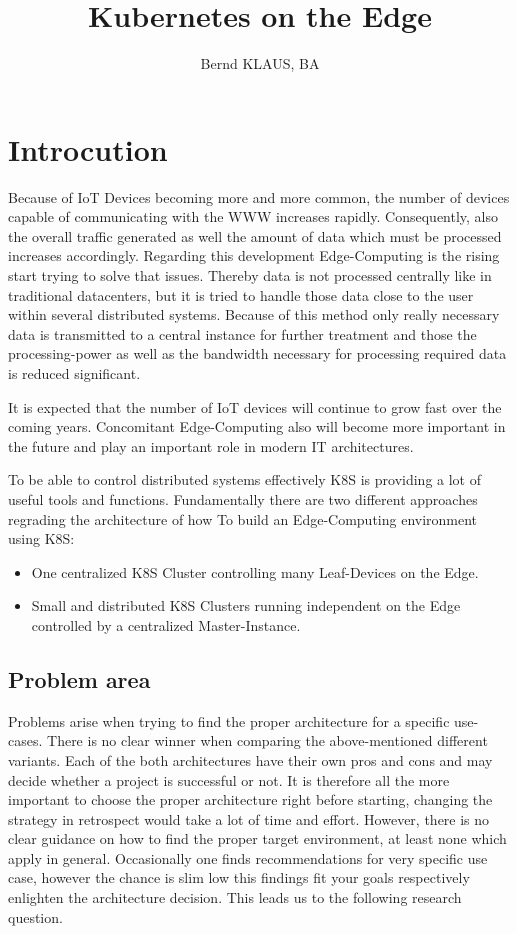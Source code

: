 \documentclass[MSC,Master,english]{twbook}%
\title{Kubernetes on the Edge}
\author{Bernd KLAUS, BA}
\begin{document}
\maketitle

\chapter{Introcution}
Because of IoT Devices becoming more and more common, the number of devices capable of communicating
with the \ac{WWW} increases rapidly. Consequently, also the overall traffic generated as well the
amount of data which must be processed increases accordingly. Regarding this development
Edge-Computing is the rising start trying to solve that issues. Thereby data is not processed
centrally like in traditional datacenters, but it is tried to handle those data close to the user 
within several distributed systems. Because of this method only really necessary data is transmitted
to a central instance for further treatment and those the processing-power as well as the bandwidth
necessary for processing required data is reduced significant. \par
It is expected that the number of IoT devices will continue to grow fast\cite{SotE21} over the
coming years. Concomitant Edge-Computing also will become more important in the future and play
an important role in modern \ac{IT} architectures. \par
To be able to control distributed systems effectively \ac{K8S} is providing a lot of useful tools
and functions. Fundamentally there are two different approaches regrading the architecture of how To
build an Edge-Computing environment using \ac{K8S}:

\begin{itemize}
    \item One centralized \ac{K8S} Cluster controlling many Leaf-Devices on the Edge.
    \item Small and distributed \ac{K8S} Clusters running independent on the Edge controlled by a
    centralized Master-Instance.
\end{itemize}

\section{Problem area}
Problems arise when trying to find the proper architecture for a specific use-cases. There is no
clear winner when comparing the above-mentioned different variants. Each of the both architectures
have their own pros and cons and may decide whether a project is successful or not. It is therefore
all the more important to choose the proper architecture right before starting, changing the
strategy in retrospect would take a lot of time and effort. However, there is no clear guidance on
how to find the proper target environment, at least none which apply in general. Occasionally one
finds recommendations for very specific use case, however the chance is slim low this findings fit
your goals respectively enlighten the architecture decision. This leads us to the following research
question.
\end{document}
